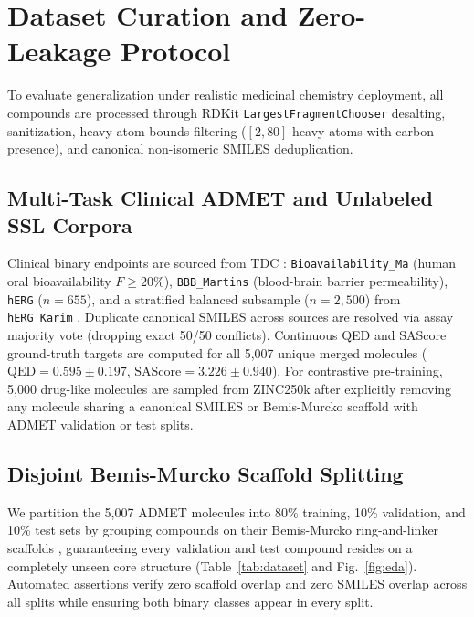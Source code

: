 \documentclass[conference]{IEEEtran}
\begin{document}
\section{Dataset Curation and Zero-Leakage Protocol}
To evaluate generalization under realistic medicinal chemistry deployment, all compounds are processed through RDKit \texttt{LargestFragmentChooser} desalting, sanitization, heavy-atom bounds filtering ($[2, 80]$ heavy atoms with carbon presence), and canonical non-isomeric SMILES deduplication.

\subsection{Multi-Task Clinical ADMET and Unlabeled SSL Corpora}
Clinical binary endpoints are sourced from TDC \cite{Huang2021TDC}: \texttt{Bioavailability\_Ma} \cite{Ma2008Bioavailability} (human oral bioavailability $F \ge 20\%$), \texttt{BBB\_Martins} \cite{Martins2012BBB} (blood-brain barrier permeability), \texttt{hERG} \cite{Wang2016hERG} ($n=655$), and a stratified balanced subsample ($n=2{,}500$) from \texttt{hERG\_Karim} \cite{Karim2021CardioTox}. Duplicate canonical SMILES across sources are resolved via assay majority vote (dropping exact 50/50 conflicts). Continuous QED \cite{Bickerton2012QED} and SAScore \cite{Ertl2009SAScore} ground-truth targets are computed for all 5,007 unique merged molecules ($\text{QED}=0.595 \pm 0.197$, $\text{SAScore}=3.226 \pm 0.940$). For contrastive pre-training, 5,000 drug-like molecules are sampled from ZINC250k \cite{GomezBombarelli2018,Sterling2015ZINC} after explicitly removing any molecule sharing a canonical SMILES or Bemis-Murcko scaffold \cite{Bemis1996Murcko} with ADMET validation or test splits.

\subsection{Disjoint Bemis-Murcko Scaffold Splitting}
We partition the 5,007 ADMET molecules into 80\% training, 10\% validation, and 10\% test sets by grouping compounds on their Bemis-Murcko ring-and-linker scaffolds \cite{Bemis1996Murcko}, guaranteeing every validation and test compound resides on a completely unseen core structure (Table~\ref{tab:dataset} and Fig.~\ref{fig:eda}). Automated assertions verify zero scaffold overlap and zero SMILES overlap across all splits while ensuring both binary classes appear in every split.
\end{document}
